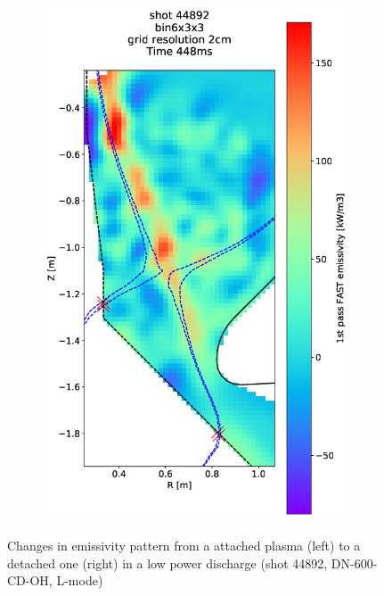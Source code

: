 \begin{figure}
\begin{subfigure}{0.21\textwidth}
         \includegraphics[trim={70 0 0 0},clip,width=\textwidth]{Chapters/chapter2/figs/44892_4.png}
         \label{fig:44892_4}
     \end{subfigure}
    \caption{Changes in emissivity pattern from a attached plasma (left) to a detached one (right) in a low power discharge (shot 44892, DN-600-CD-OH, L-mode)}
    \label{fig:44892}
\end{figure}

